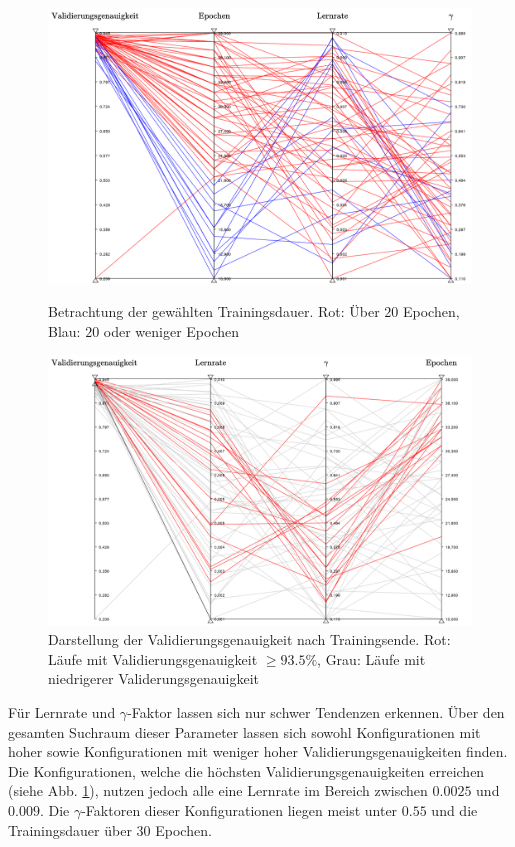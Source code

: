 \\
\begin{figure}[h]
\includegraphics[scale=0.58]{NNOPT/attention_epochs.pdf}
\caption{Betrachtung der gewählten Trainingsdauer. Rot: Über $20$ Epochen, Blau: $20$ oder weniger Epochen}
\label{attention_epochs}
\includegraphics[scale=0.58]{NNOPT/attention_top_runs.pdf}
\caption{Darstellung der Validierungsgenauigkeit nach Trainingsende. Rot: Läufe mit Validierungsgenauigkeit $\geq 93.5\%$, Grau: Läufe mit niedrigerer Validerungsgenauigkeit}
\label{attention_top}
\end{figure}
\clearpage
Für Lernrate und $\gamma$-Faktor lassen sich nur schwer Tendenzen erkennen. Über den gesamten Suchraum dieser Parameter lassen sich sowohl Konfigurationen mit hoher sowie Konfigurationen mit weniger hoher Validierungsgenauigkeiten finden. Die Konfigurationen, welche die höchsten Validierungsgenauigkeiten erreichen (siehe Abb. \ref{attention_top}), nutzen jedoch alle eine Lernrate im Bereich zwischen $0.0025$ und $0.009$. Die $\gamma$-Faktoren dieser Konfigurationen liegen meist unter $0.55$ und die Trainingsdauer über $30$ Epochen.
